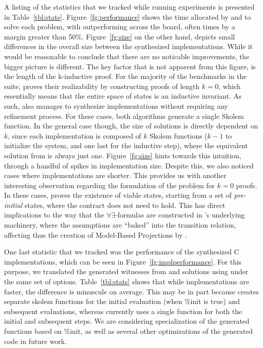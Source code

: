 A listing of the statistics that we tracked while running experiments is
presented in Table~\ref{tbl:stats}.
Figure~\ref{fg:performance} shows the time allocated by \jsyn and \jsynvg to solve each problem, with \jsynvg
outperforming \jsyn across the board, often times by a margin greater than
50\%. Figure~\ref{fg:size} on the other hand, depicts small differences in the
overall size between the synthesized implementations. While it would be
reasonable to conclude that there are no noticable improvements, the bigger
picture is different. The key factor that is not apparent from this figure, is the length of the k-inductive proof. For the majority of the benchmarks in the suite, \jsyn proves their realizability by constructing proofs of length $k=0$, which essentially means
that the entire space of states is an inductive invariant. As such, \jsynvg
also manages to synthesize implementations without requiring any refinement
process. For these cases, both algorithms generate a single Skolem function. In the general case though, the size of \jsyn solutions is directly
dependent on $k$, since each implementation is composed of $k$ Skolem
functions ($k-1$ to initialize the system, and one last for the inductive step),
where the equivalent solution from \jsynvg is always just one.
Figure~\ref{fg:size} hints towards this intuition, through a handful of spikes
in \jsyn implementation size. Despite this, we also noticed cases where \jsyn
implementations are shorter. This provides us with another interesting
observation regarding the formulation of the problem for $k=0$ proofs. In
these cases, \jsyn proves the existence of viable states, starting from a set
of \textit{pre-initial} states, where the contract does not need to hold. This
has direct implications to the way that the $\forall\exists$-formulas are
constructed in \jsyn's underlying machinery, where the assumptions are ``baked''
into the transition relation, affecting thus the creation of Model-Based
Projections by \aeval.

 One last statistic that we tracked was the performance of the synthesized C
 implementations, which can be seen in Figure~\ref{fg:implperformance}. For this purpose, we translated the
 generated witnesses from \jsyn and \jsynvg solutions using
 \smtlibtoc under the same set of options. Table~\ref{tbl:stats} shows that
 while \jsyn implementations are faster, the difference is minuscule on average. 
This may be in part because \jsyn creates separate skolem functions for the initial evaluation (when \%init is true) and subsequent evaluations, whereas currently \jsynvg uses a single function for both the initial and subsequent steps.  We are considering specialization of the generated \jsynvg functions based on \%init, as well as several other optimizations of the generated code in future work.

